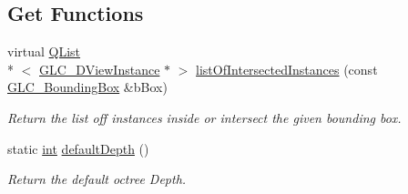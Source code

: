 \subsection*{Get Functions}
\begin{DoxyCompactItemize}
\item 
virtual \hyperlink{class_q_list}{Q\-List}\\*
$<$ \hyperlink{class_g_l_c__3_d_view_instance}{G\-L\-C\-\_\-D\-View\-Instance} $\ast$ $>$ \hyperlink{class_g_l_c___octree_acf746bc31c368e8788b588a36902501b}{list\-Of\-Intersected\-Instances} (const \hyperlink{class_g_l_c___bounding_box}{G\-L\-C\-\_\-\-Bounding\-Box} \&b\-Box)
\begin{DoxyCompactList}\small\item\em Return the list off instances inside or intersect the given bounding box. \end{DoxyCompactList}\item 
static \hyperlink{ioapi_8h_a787fa3cf048117ba7123753c1e74fcd6}{int} \hyperlink{class_g_l_c___octree_adeb46e4b4deba2479ab270a31344ba00}{default\-Depth} ()
\begin{DoxyCompactList}\small\item\em Return the default octree Depth. \end{DoxyCompactList}\end{DoxyCompactItemize}
